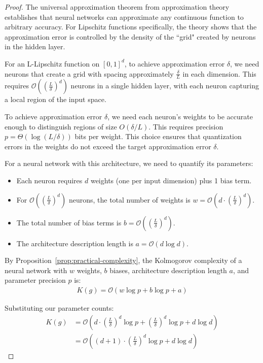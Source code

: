 \documentclass[11pt,letter,leqno]{article}
\begin{document}
\begin{proof}
The universal approximation theorem from approximation theory~\cite{Barron1993, Cybenko1989} establishes that neural networks can approximate any continuous function to arbitrary accuracy.  For Lipschitz functions specifically, the theory shows that the approximation error is controlled by the density of the ``grid" created by neurons in the hidden layer.

For an L-Lipschitz function on $[0, 1]^d$, to achieve approximation error $\delta$, we need neurons that create a grid with spacing approximately $\frac{\delta}{L}$ in each dimension.  This requires $\mathcal{O}\left(\left(\frac{L}{\delta}\right)^d\right)$ neurons in a single hidden layer, with each neuron capturing a local region of the input space.

To achieve approximation error $\delta$, we need each neuron's weights to be accurate enough to distinguish regions of size $O(\delta/L)$. This requires precision $p = \Theta(\log(L/\delta))$ bits per weight. This choice ensures that quantization errors in the weights do not exceed the target approximation error $\delta$.

For a neural network with this architecture, we need to quantify its parameters:
\begin{itemize}
\item Each neuron requires $d$ weights (one per input dimension) plus 1 bias term.
\item For $\mathcal{O}\left(\left(\frac{L}{\delta}\right)^d\right)$ neurons, the total number of weights is $w = \mathcal{O}\left(d \cdot \left(\frac{L}{\delta}\right)^d\right)$.
\item The total number of bias terms is $b = \mathcal{O}\left(\left(\frac{L}{\delta}\right)^d\right)$.
\item The architecture description length is $a = \mathcal{O}(d \log d)$.
\end{itemize}

By Proposition~\ref{prop:practical-complexity}, the Kolmogorov complexity of a neural network with $w$ weights, $b$ biases, architecture description length $a$, and parameter precision $p$ is:
\begin{align}
K(g) = \mathcal{O}(w \log p + b \log p + a)
\end{align}

Substituting our parameter counts:
\begin{align}
K(g) &= \mathcal{O}\left(d \cdot \left(\frac{L}{\delta}\right)^d \log p + \left(\frac{L}{\delta}\right)^d \log p + d \log d\right)\\
&= \mathcal{O}\left(\left(d + 1\right) \cdot \left(\frac{L}{\delta}\right)^d \log p + d \log d\right)
\end{align}


\end{proof}
\end{document}
